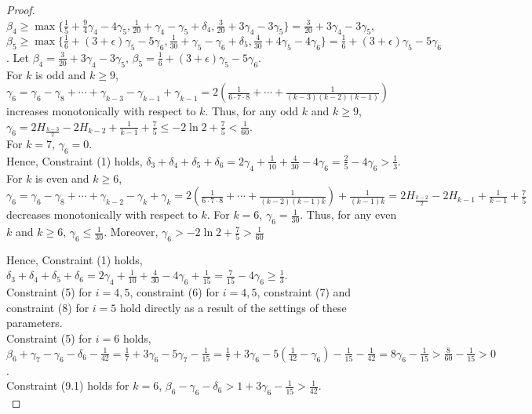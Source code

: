 \documentclass[runningheads,a4paper]{llncs}
\numberwithin{equation}{section}
\begin{document}
\begin{proof}
$\beta_4\geq\max\{\frac{1}{5}+\frac{9}{4}\gamma_4-4\gamma_5,\frac{1}{20}+\gamma_4-\gamma_5+\delta_4,\frac{3}{20}+3\gamma_4-3\gamma_5\}=\frac{3}{20}+3\gamma_4-3\gamma_5$, $\beta_5\geq\max\{\frac{1}{6}+(3+\epsilon)\gamma_5-5\gamma_6,\frac{1}{30}+\gamma_5-\gamma_6+\delta_5,\frac{4}{30}+4\gamma_5-4\gamma_6\}=\frac{1}{6}+(3+\epsilon)\gamma_5-5\gamma_6$. Let $\beta_4=\frac{3}{20}+3\gamma_4-3\gamma_5$, $\beta_5=\frac{1}{6}+(3+\epsilon)\gamma_5-5\gamma_6$. \\


For $k$ is odd and $k\geq 9$, $\gamma_6=\gamma_6-\gamma_8+\cdots+\gamma_{k-3}-\gamma_{k-1}+\gamma_{k-1}=2(\frac{1}{6\cdot 7\cdot 8}+\cdots+\frac{1}{(k-3)(k-2)(k-1)})$ increases monotonically with respect to $k$. Thus, for any odd $k$ and $k\geq 9$,  $\gamma_6=2H_{\frac{k-3}{2}}-2H_{k-2}+\frac{1}{k-1}+\frac{7}{5}\leq -2\ln 2+\frac{7}{5}<\frac{1}{60}$.\\
For $k=7$, $\gamma_6=0$. \\

Hence, Constraint (1) holds, $\delta_3+\delta_4+\delta_5+\delta_6=2\gamma_4+\frac{1}{10}+\frac{4}{30}-4\gamma_6=\frac{2}{5}-4\gamma_6>\frac{1}{3}$. \\

For $k$ is even and $k\geq 6$, $\gamma_6=\gamma_6-\gamma_8+\cdots+\gamma_{k-2}-\gamma_{k}+\gamma_{k}=2(\frac{1}{6\cdot 7\cdot 8}+\cdots+\frac{1}{(k-2)(k-1)k})+\frac{1}{(k-1)k}=2H_{\frac{k-2}{2}}-2H_{k-1}+\frac{1}{k-1}+\frac{7}{5}$ decreases monotonically with respect to $k$.
For $k=6$, $\gamma_6=\frac{1}{30}$. Thus, for any even $k$ and $k\geq 6$, $\gamma_6\leq \frac{1}{30}$. Moreover, $\gamma_6>-2\ln 2+\frac{7}{5}>\frac{1}{60}$

Hence, Constraint (1) holds, $\delta_3+\delta_4+\delta_5+\delta_6=2\gamma_4+\frac{1}{10}+\frac{4}{30}-4\gamma_6+\frac{1}{15}=\frac{7}{15}-4\gamma_6\geq\frac{1}{3}$. \\

Constraint (5) for $i=4,5$, constraint (6) for $i=4,5$, constraint (7) and constraint (8) for $i=5$ hold directly as a result of the settings of these parameters. \\

Constraint (5) for $i=6$ holds, $\beta_6+\gamma_7-\gamma_6-\delta_6-\frac{1}{42}=\frac{1}{7}+3\gamma_6-5\gamma_7-\frac{1}{15}=\frac{1}{7}+3\gamma_6-5(\frac{1}{42}-\gamma_6)-\frac{1}{15}-\frac{1}{42}=8\gamma_6-\frac{1}{15}>\frac{8}{60}-\frac{1}{15}>0$.\\

Constraint (9.1) holds for $k=6$, $\beta_6-\gamma_6-\delta_6>1+3\gamma_6-\frac{1}{15}>\frac{1}{42}$. \\


\end{proof}
\end{document}
